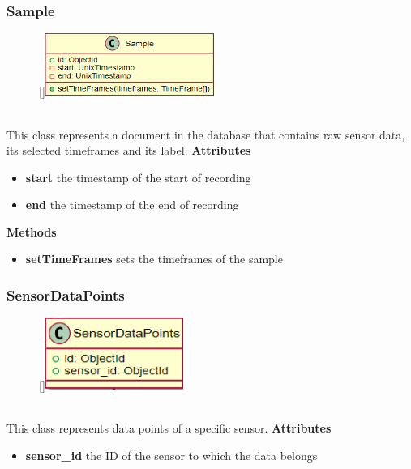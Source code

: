 \newpage
\subsubsection{Sample}
\label{Sample}
\begin{figure}
    \raisebox{0pt}[\dimexpr{}\baselineskip\relax]{\includegraphics[width=5.5cm]{classes/workspace-management/7.png}}
\end{figure}
~\\
This class represents a document in the database that contains raw sensor data, its selected timeframes and its label.
\newline
\newline
\newline
\textbf{Attributes}
\begin{itemize}
    \item \textbf{start} the timestamp of the start of recording
    \item \textbf{end} the timestamp of the end of recording
\end{itemize}
\textbf{Methods}
\begin{itemize}
    \item \textbf{setTimeFrames} sets the timeframes of the sample
\end{itemize}

\subsubsection{SensorDataPoints}
\label{SensorDataPoints}
\begin{figure}
    \raisebox{0pt}[\dimexpr{}\baselineskip\relax]{\includegraphics[width=4.5cm]{classes/workspace-management/8.png}}
\end{figure} 
~\\
This class represents data points of a specific sensor.
\newline
\newline
\newline
\newline
\textbf{Attributes}
\begin{itemize}
    \item \textbf{sensor\_id} the ID of the sensor to which the data belongs
\end{itemize}

